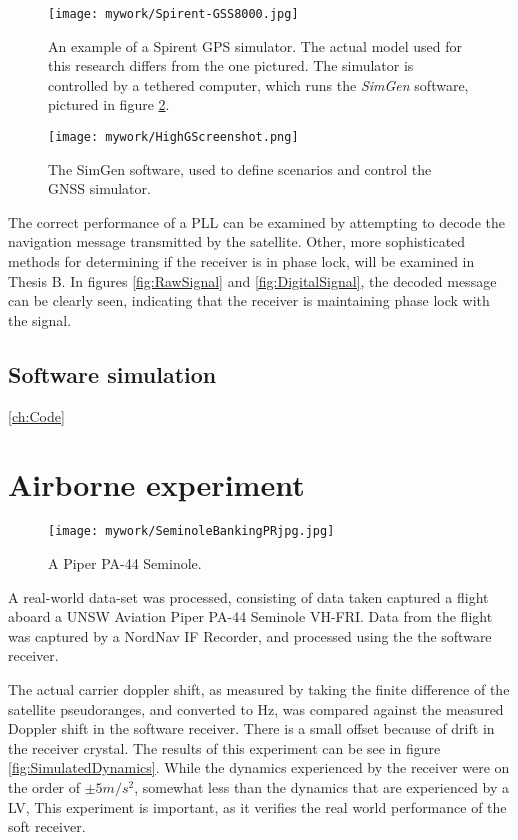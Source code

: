 \begin{figure}[!htb] 
    \centering
    \texttt{[image: mywork/Spirent-GSS8000.jpg]} 
    \caption{An example of a Spirent \ac{GPS} simulator. The actual model used for this research differs from the one pictured. The simulator is controlled by a tethered computer, which runs the \emph{SimGen} software, pictured in figure \ref{:HighGScreenshot}.}
    \label{fig:Spirent}
\end{figure}

\begin{figure}[!htb] 
    \centering
    \texttt{[image: mywork/HighGScreenshot.png]} 
    \caption{The SimGen software, used to define scenarios and control the \ac{GNSS} simulator.}
    \label{:HighGScreenshot}
\end{figure}


The correct performance of a \ac{PLL} can be examined by attempting to decode the navigation message transmitted by the satellite. Other, more sophisticated methods for determining if the  receiver is in phase lock, will be examined in Thesis B. In figures \ref{fig:RawSignal} and \ref{fig:DigitalSignal}, the decoded message can be clearly seen, indicating that the receiver is maintaining phase lock with the signal.

\subsection{Software simulation}
\ref{ch:Code}

\section{Airborne experiment}

\begin{figure}[!htb] 
    \centering
    \texttt{[image: mywork/SeminoleBankingPRjpg.jpg]} 
    \caption{A Piper PA-44 Seminole.}
    \label{fig:PiperSeminole}
\end{figure}

A real-world data-set was processed, consisting of data taken captured a flight aboard a UNSW Aviation Piper PA-44 Seminole VH-FRI. Data from the flight was captured by a NordNav IF Recorder, and processed using the the software receiver. 

The actual carrier doppler shift, as measured by taking the finite difference of the satellite pseudoranges, and converted to Hz, was compared against the measured Doppler shift in the software receiver. There is a small offset because of drift in the receiver crystal. The results of this experiment can be see in figure \ref{fig:SimulatedDynamics}. While the dynamics experienced by the receiver were on the order of $\pm 5m/s^2$, somewhat less than the dynamics that are experienced by a \ac{LV}, This experiment is important, as it verifies the real world performance of the soft receiver. 

